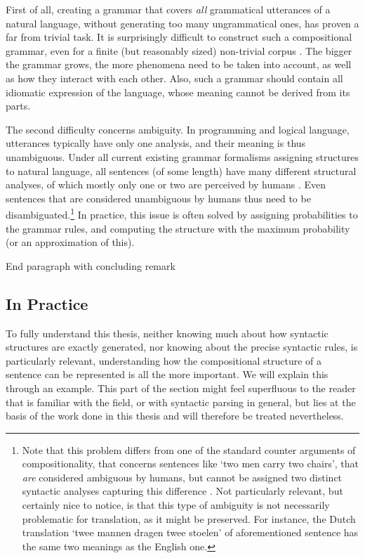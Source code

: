 \documentclass{report}
\theoremstyle{definition}
\theoremstyle{plain}
\begin{document}
First of all, creating a grammar that covers \textit{all} grammatical utterances of a natural language, without generating too many ungrammatical ones, has proven a far from trivial task. It is surprisingly difficult to construct such a compositional grammar, even for a finite (but reasonably sized) non-trivial corpus \citep{scha1990taaltheorie}. The bigger the grammar grows, the more phenomena need to be taken into account, as well as how they interact with each other. Also, such a grammar should contain all idiomatic expression of the language, whose meaning cannot be derived from its parts.

The second difficulty concerns ambiguity. In programming and logical language, utterances typically have only one analysis, and their meaning is thus unambiguous. Under all current existing grammar formalisms assigning structures to natural language, all sentences (of some length) have many different structural analyses, of which mostly only one or two are perceived by humans \citep{scha1990taaltheorie}. Even sentences that are considered unambiguous by humans thus need to be disambiguated.\footnote{Note that this problem differs from one of the standard counter arguments of compositionality, that concerns sentences like `two men carry two chairs', that \textit{are} considered ambiguous by humans, but cannot be assigned two distinct syntactic analyses capturing this difference \citep{pelletier1994principle}. Not particularly relevant, but certainly nice to notice, is that this type of ambiguity is not necessarily problematic for translation, as it might be preserved. For instance, the Dutch translation `twee mannen dragen twee stoelen' of aforementioned sentence has the same two meanings as the English one.} In practice, this issue is often solved by assigning probabilities to the grammar rules, and computing the structure with the maximum probability (or an approximation of this).

End paragraph with concluding remark


\subsection{In Practice}

To fully understand this thesis, neither knowing much about how syntactic structures are exactly generated, nor knowing about the precise syntactic rules, is particularly relevant, understanding how the compositional structure of a sentence can be represented is all the more important. We will explain this through an example. This part of the section might feel superfluous to the reader that is familiar with the field, or with syntactic parsing in general, but lies at the basis of the work done in this thesis and will therefore be treated nevertheless.
\end{document}
